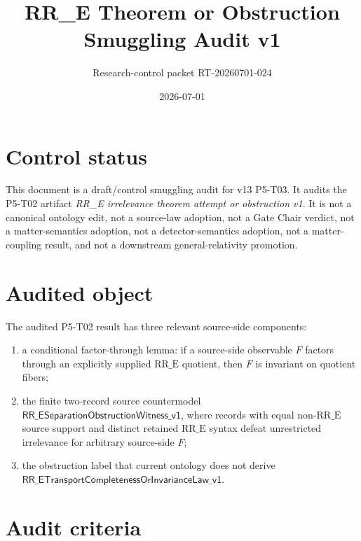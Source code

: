 \documentclass[11pt]{article}
\title{RR\_E Theorem or Obstruction Smuggling Audit v1}
\author{Research-control packet RT-20260701-024}
\date{2026-07-01}
\newcommand{\RRE}{\mathrm{RR\_E}}
\newcommand{\MissingLaw}{\mathsf{RR\_ETransportCompletenessOrInvarianceLaw\_v1}}
\newcommand{\Witness}{\mathsf{RR\_ESeparationObstructionWitness\_v1}}
\begin{document}
\maketitle

\section{Control status}

This document is a draft/control smuggling audit for v13 P5-T03.  It audits
the P5-T02 artifact
\emph{RR\_E irrelevance theorem attempt or obstruction v1}.  It is not a
canonical ontology edit, not a source-law adoption, not a Gate Chair verdict,
not a matter-semantics adoption, not a detector-semantics adoption, not a
matter-coupling result, and not a downstream general-relativity promotion.

\section{Audited object}

The audited P5-T02 result has three relevant source-side components:
\begin{enumerate}[label=(\alph*)]
  \item a conditional factor-through lemma: if a source-side observable
  \(F\) factors through an explicitly supplied \(\RRE\) quotient, then \(F\)
  is invariant on quotient fibers;
  \item the finite two-record source countermodel \(\Witness\), where records
  with equal non-\(\RRE\) source support and distinct retained \(\RRE\) syntax
  defeat unrestricted irrelevance for arbitrary source-side \(F\);
  \item the obstruction label that current ontology does not derive
  \(\MissingLaw\).
\end{enumerate}

\section{Audit criteria}
\end{document}
